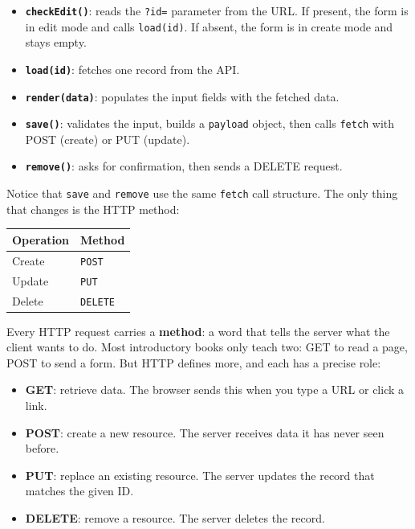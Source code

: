 \documentclass[11pt,a4paper,oneside]{book}
\providecommand{\tightlist}{%
  \setlength{\itemsep}{0pt}\setlength{\parskip}{0pt}}
\begin{document}
\begin{itemize}
\tightlist
\item
  \textbf{\texttt{checkEdit()}}: reads the \texttt{?id=}
  parameter from the URL. If present, the form is in edit mode
  and calls \texttt{load(id)}. If absent, the form is in create
  mode and stays empty.
\item
  \textbf{\texttt{load(id)}}: fetches one record from the API.
\item
  \textbf{\texttt{render(data)}}: populates the input fields with
  the fetched data.
\item
  \textbf{\texttt{save()}}: validates the input, builds a
  \texttt{payload} object, then calls \texttt{fetch} with POST
  (create) or PUT (update).
\item
  \textbf{\texttt{remove()}}: asks for confirmation, then sends a
  DELETE request.
\end{itemize}

Notice that \texttt{save} and \texttt{remove} use the same
\texttt{fetch} call structure. The only thing that changes is the
HTTP method:

\begin{longtable}[]{@{}ll@{}}
\toprule
Operation & Method \\
\midrule
\endhead
Create & \texttt{POST} \\
Update & \texttt{PUT} \\
Delete & \texttt{DELETE} \\
\bottomrule
\end{longtable}

Every HTTP request carries a \textbf{method}: a word that tells
the server what the client wants to do. Most introductory books
only teach two: GET to read a page, POST to send a form. But HTTP
defines more, and each has a precise role:

\begin{itemize}
\tightlist
\item
  \textbf{GET}: retrieve data. The browser sends this when you
  type a URL or click a link.
\item
  \textbf{POST}: create a new resource. The server receives data
  it has never seen before.
\item
  \textbf{PUT}: replace an existing resource. The server updates
  the record that matches the given ID.
\item
  \textbf{DELETE}: remove a resource. The server deletes the
  record.
\end{itemize}
\end{document}
